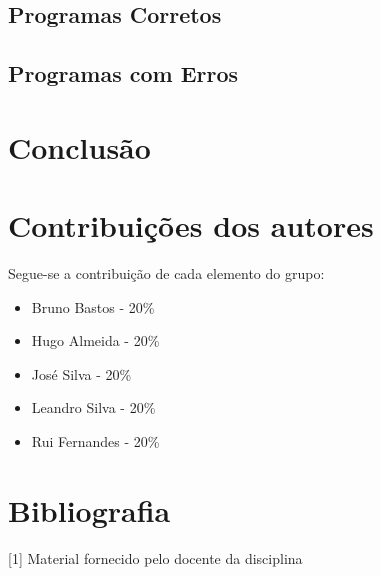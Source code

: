 \documentclass[10pt,portuguese]{article}
\begin{document}
\subsection{Programas Corretos}



\subsection{Programas com Erros}

\section{Conclusão}

\section{Contribuições dos autores}
\par Segue-se a contribuição de cada elemento do grupo:
\begin{itemize}
    \item Bruno Bastos -  20\%
	\item Hugo Almeida - 20\%
	\item José Silva - 20\%
    \item Leandro Silva - 20\%
	\item Rui Fernandes - 20\%
\end{itemize}

\clearpage

\section{Bibliografia}





\vspace{5mm} %

[1] Material fornecido pelo docente da disciplina
\end{document}
